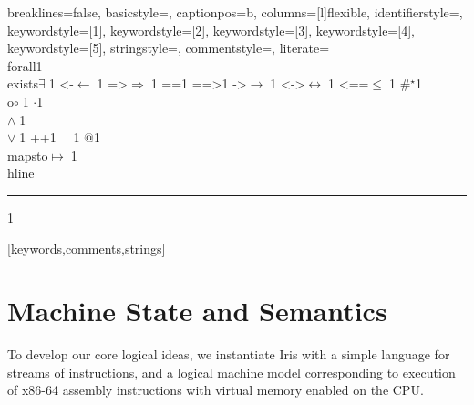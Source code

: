 {    %
    breaklines=false,
    basicstyle=\small,
    captionpos=b,
    columns=[l]flexible,
    identifierstyle={\ttfamily\color{black}},
    keywordstyle=[1]{\ttfamily\color{dkviolet}},
    keywordstyle=[2]{\ttfamily\color{dkgreen}},
    keywordstyle=[3]{\ttfamily\color{ltblue}},
    keywordstyle=[4]{\ttfamily\color{dkblue}},
    keywordstyle=[5]{\ttfamily\color{dkred}},
    stringstyle=\ttfamily,
    commentstyle={\ttfamily\color{dkgreen}},
    literate=
    {\\forall}{{\color{dkgreen}{$\forall\;$}}}1
    {\\exists}{{$\exists\;$}}1
    {<-}{{$\leftarrow\;$}}1
    {=>}{{$\Rightarrow\;$}}1
    {==}{{\code{==}\;}}1
    {==>}{{\code{==>}\;}}1
    {->}{{$\rightarrow\;$}}1
    {<->}{{$\leftrightarrow\;$}}1
    {<==}{{$\leq\;$}}1
    {\#}{{$^\star$}}1 
    {\\o}{{$\circ\;$}}1 
    {\@}{{$\cdot$}}1 
    {\/\\}{{$\wedge\;$}}1
    {\\\/}{{$\vee\;$}}1
    {++}{{\code{++}}}1
    {~}{{\ }}1
    {\@\@}{{$@$}}1
    {\\mapsto}{{$\mapsto\;$}}1
    {\\hline}{{\rule{\linewidth}{0.5pt}}}1
}[keywords,comments,strings]
\section{Machine State and Semantics}
\label{sec:syntax}
To develop our core logical ideas, we instantiate \textsf{Iris} with a simple language for streams of instructions, 
and a logical machine model corresponding to execution of x86-64 assembly instructions with virtual memory enabled on the 
CPU.

